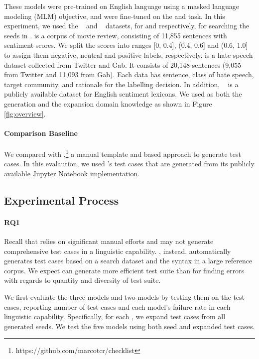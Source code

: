 These models were pre-trained on English language using a masked
language modeling (MLM) objective, and were fine-tuned on the \sa and
\hsd task. In this experiment, we used the \Sst~\cite{socher2013sst}
and \Hatexp~\cite{mathew2021hatexplain} datasets, for \sa and \hsd
respectively, for searching the seeds in \tool. \Sst is a corpus of
movie review, consisting of 11,855 sentences with sentiment scores. We
split the scores into ranges [0, 0.4], (0.4, 0.6] and (0.6, 1.0] to
    assign them negative, neutral and positive labels,
    respectively. \Hatexp is a hate speech dataset collected from
    Twitter and Gab. It consists of 20,148 sentences (9,055 from
    Twitter and 11,093 from Gab). Each data has sentence, class of
    hate speech, target community, and rationale for the labelling
    decision.  In addition, \Swn~\cite{baccianella2010sentiwordnet} is
    a publicly available dataset for English sentiment lexicons.  We
    used \Swn as both the generation and the expansion domain
    knowledge as shown in Figure \ref{fig:overview}.

\paragraph*{\textbf{Comparison Baseline}}
We compared \tool with
\Cklst,\footnote{https://github.com/marcotcr/checklist} a manual
template and \lc based approach to generate test cases. In this
evalaution, we used \Cklst's \sa test cases that are generated from
its publicly available Jupyter Notebook implementation. 

\subsection{Experimental Process}

\paragraph*{\textbf{RQ1}}
Recall that \Cklst relies on significant manual efforts and may not
generate comprehensive test cases in a linguistic capability. \tool,
instead, automatically generates test cases based on a search dataset
and the syntax in a large reference corpus.  We expect \tool can
generate more efficient test suite than \Cklst for finding errors with
regards to quantity and diversity of test suite.

We first evaluate the three \sa models and two \hsd models by testing
them on the \tool test cases, reporting number of test cases and each
model's failure rate in each linguistic capability. Specifically, for
each \lc, we expand test cases from all generated seeds.
We test the five models using both seed and expanded test cases. 

